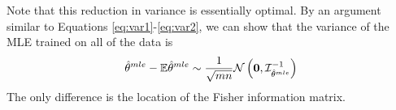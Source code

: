 \documentclass[twoside]{article}
\newtheorem{theorem}{Theorem}
\newtheorem{lemma}{Lemma}
\DeclareMathOperator*{\tr}{tr}
\newcommand{\zero}{\text{\textbf{0}}}
\newcommand{\E}{\mathbb{E}}
\newcommand{\x}{\mathbf{x}}
\newcommand{\w}{\theta}
\newcommand{\wave}{\hat\w^{ave}}
\newcommand{\wtave}{\E\hat\w^{ave}}
\newcommand{\wmle}{\hat\w^{mle}}
\newcommand{\tvar}{t_{\text{\textit{var}}}}
\newcommand{\I}{\mathcal I}
\newcommand{\normal}[2]{\ensuremath{\mathcal{N}\left({{#1}},{{#2}}\right)}}
\newcommand{\trans}[1]{\ensuremath{{#1}^{\mathsf{T}}}}
\newcommand{\ltwo}[1]{{\left\lVert {#1} \right\rVert}}
\newcommand{\prob}[1]{\Pr\left[{#1}\right]}
\newcommand{\ignore}[1]{}
\begin{document}
Note that this reduction in variance is essentially optimal.
By an argument similar to Equations \ref{eq:var1}-\ref{eq:var2},
we can show that the variance of the MLE trained on all of the data is
\begin{equation}
\wmle - \E\wmle \sim \frac{1}{\sqrt{mn}} \normal{\zero}{\I^{-1}_{\wmle}}
\end{equation}
The only difference is the location of the Fisher information matrix.



\end{document}
